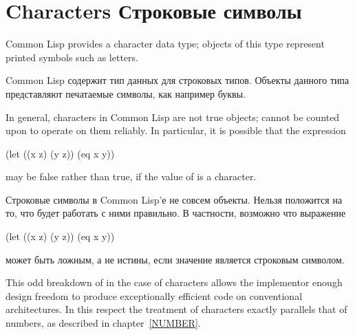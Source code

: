 
\clearpage\def\pagestatus{FINAL PROOF}

\chapter{Characters Строковые символы}

Common Lisp provides a character data type; objects of this type
represent printed symbols such as letters.

Common Lisp содержит тип данных для строковых типов. Объекты данного типа
представляют печатаемые символы, как например буквы.

In general, characters in Common Lisp are not true objects;  cannot
be counted upon to operate on them reliably.  In particular,
it is possible that the expression
\begin{lisp}
(let ((x z) (y z)) (eq x y))
\end{lisp}
may be false rather than true, if the value of  is a character.

Строковые символы в Common Lisp'е не совсем объекты. Нельзя положится на то, что
 будет работать с ними правильно. В частности, возможно что выражение
\begin{lisp}
(let ((x z) (y z)) (eq x y))
\end{lisp}
может быть ложным, а не истины, если значение  является строковым
символом.

\beforenoterule
\begin{rationale}
This odd breakdown of  in the case of characters
allows the implementor enough design freedom to produce exceptionally
efficient code on conventional architectures.  In this respect the
treatment of characters exactly parallels that of numbers, as described
in chapter~\ref{NUMBER}.
\end{rationale}
\afternoterule


